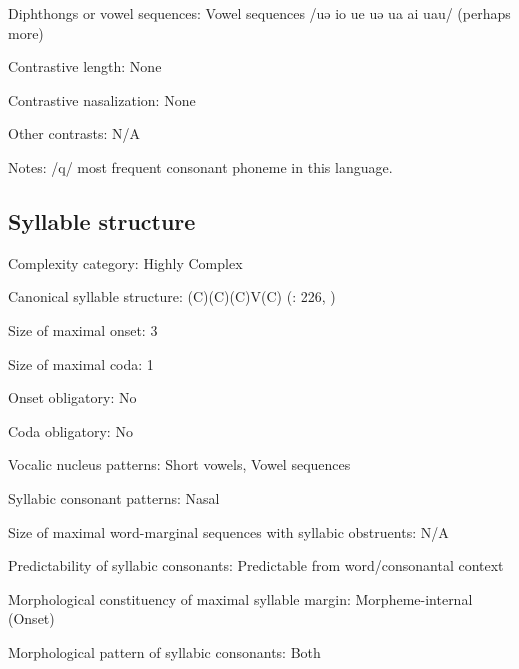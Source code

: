 {\begin{appendixdesc}
\item[Diphthongs or vowel sequences:] Vowel sequences /uə io ue uə ua ai uau/ (perhaps more)

\item[Contrastive length:] None

\item[Contrastive nasalization:] None

\item[Other contrasts:] N/A

\item[Notes:] /q/ most frequent consonant phoneme in this language.
\end{appendixdesc}
\subsection*{Syllable structure}
\begin{appendixdesc}

\item[Complexity category:] Highly Complex

\item[Canonical syllable structure:] (C)(C)(C)V(C) (\citealt{Whitehead2004}: 226, \citealt{Whitehead1992})

\item[Size of maximal onset:] 3

\item[Size of maximal coda:] 1

\item[Onset obligatory:] No

\item[Coda obligatory:] No

\item[Vocalic nucleus patterns:] Short vowels, Vowel sequences

\item[Syllabic consonant patterns:] Nasal

\item[Size of maximal word-marginal sequences with syllabic obstruents:] N/A

\item[Predictability of syllabic consonants:] Predictable from word/consonantal context

\item[Morphological constituency of maximal syllable margin:] Morpheme-internal (Onset)

\item[Morphological pattern of syllabic consonants:] Both


\end{appendixdesc}}
